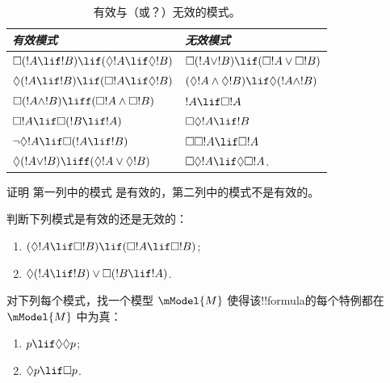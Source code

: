 \documentclass[../../../include/open-logic-section]{subfiles}
\begin{document}
\begin{table}[t]
    \centering
    \begin{tabular}{| l || l |}
      \hline
      {\emph{有效模式}} & {\emph{无效模式}} \\
      \hline\hline
      $\Box(!A \lif !B) \lif (\Diamond !A \lif \Diamond !B)$
      & $\Box (!A \lor !B) \lif (\Box !A \lor \Box !B)$ \\
      $\Diamond (!A \lif !B) \lif (\Box !A \lif \Diamond
      !B)$
      & $(\Diamond !A \land \Diamond !B) \lif \Diamond (!A
      \land !B)$\\
      $\Box (!A \land !B) \liff (\Box !A \land \Box !B)$
      & $!A \lif \Box !A$ \\
      $\Box !A \lif \Box (!B \lif !A)$
      & $\Box \Diamond !A \lif !B$ \\
      $\lnot \Diamond !A \lif \Box (!A \lif !B)$
      & $\Box \Box !A \lif \Box !A$ \\
      $\Diamond (!A \lor !B) \liff (\Diamond !A \lor
      \Diamond !B)$
      & $\Box \Diamond !A \lif \Diamond \Box !A$. \\
      \hline
    \end{tabular}
    \caption{有效与（或？）无效的模式。}
\end{table}

\begin{prob}%
  证明  第一列中的模式
  是有效的，第二列中的模式不是有效的。
\end{prob}

\begin{prob}
  判断下列模式是有效的还是无效的：
  \begin{enumerate}
  \item $(\Diamond !A \lif \Box !B) \lif (\Box !A \lif \Box
    !B)$;
  \item $\Diamond(!A \lif !B) \lor \Box(!B \lif !A)$.
  \end{enumerate}
\end{prob}

\begin{prob}
  对下列每个模式，找一个模型 $\mModel{M}$ 使得该!!{formula}的每个特例都在 $\mModel{M}$ 中为真：
  \begin{enumerate}
  \item $p \lif \Diamond\Diamond p$;
  \item $\Diamond p \lif \Box p$.
  \end{enumerate}
\end{prob}
\end{document}
